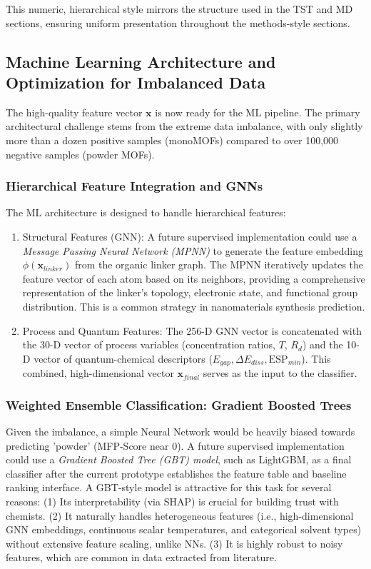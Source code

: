 \documentclass[12pt,a4paper]{article}
\begin{document}
This numeric, hierarchical style mirrors the structure used in the TST and MD sections, ensuring uniform presentation throughout the methods-style sections.

\subsection{Machine Learning Architecture and Optimization for Imbalanced Data}

The high-quality feature vector $\mathbf{x}$ is now ready for the ML pipeline. The primary architectural challenge stems from the extreme data imbalance, with only slightly more than a dozen positive samples (monoMOFs) compared to over 100,000 negative samples (powder MOFs). 

\subsubsection{Hierarchical Feature Integration and GNNs}

The ML architecture is designed to handle hierarchical features:
\begin{enumerate}
    \item Structural Features (GNN): A future supervised implementation could use a \textit{Message Passing Neural Network (MPNN)} to generate the feature embedding $\phi(\mathbf{x}_{linker})$ from the organic linker graph. The MPNN iteratively updates the feature vector of each atom based on its neighbors, providing a comprehensive representation of the linker's topology, electronic state, and functional group distribution. This is a common strategy in nanomaterials synthesis prediction.\cite{ref17}
    \item Process and Quantum Features: The 256-D GNN vector is concatenated with the 30-D vector of process variables (concentration ratios, $T$, $R_d$) and the 10-D vector of quantum-chemical descriptors ($E_{gap}, \Delta E_{diss}, \text{ESP}_{min}$). This combined, high-dimensional vector $\mathbf{x}_{final}$ serves as the input to the classifier.
\end{enumerate}

\subsubsection{Weighted Ensemble Classification: Gradient Boosted Trees}

Given the imbalance, a simple Neural Network would be heavily biased towards predicting 'powder' (MFP-Score near 0). A future supervised implementation could use a \textit{Gradient Boosted Tree (GBT) model}, such as LightGBM, as a final classifier after the current prototype establishes the feature table and baseline ranking interface. A GBT-style model is attractive for this task for several reasons: (1) Its interpretability (via SHAP) is crucial for building trust with chemists. (2) It naturally handles heterogeneous features (i.e., high-dimensional GNN embeddings, continuous scalar temperatures, and categorical solvent types) without extensive feature scaling, unlike NNs. (3) It is highly robust to noisy features, which are common in data extracted from literature.
\end{document}
